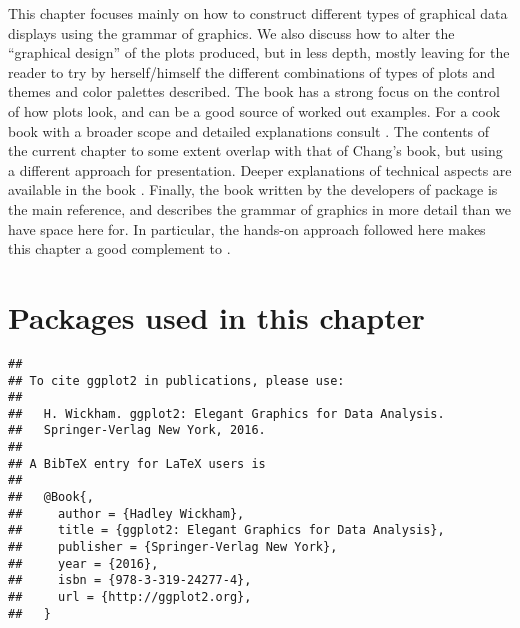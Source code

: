 \documentclass[krantz2]{krantz}\usepackage{knitr}%
\begin{document}
This chapter focuses mainly on how to construct different types of graphical data displays using the grammar of graphics. We also discuss how to alter the ``graphical design'' of the plots produced, but in less depth, mostly leaving for the reader to try by herself/himself the different combinations of types of plots and themes and color palettes described. The book  \autocite{Burchell2016} has a strong focus on the control of how plots look, and can be a good source of worked out examples. For a cook book with a broader scope and detailed explanations consult  \autocite{Chang2013}. The contents of the current chapter to some extent overlap with that of Chang's book, but using a different approach for presentation. Deeper explanations of technical aspects are available in the book  \autocite{Murrell2011}. Finally, the book  \autocite{Wickham2016} written by the developers of package  is the main reference, and describes the grammar of graphics in more detail than we have space here for. In particular, the hands-on approach followed here makes this chapter a good complement to .

\section{Packages used in this chapter}

\begin{knitrout}\footnotesize
{}\color{fgcolor}\begin{kframe}
\begin{alltt}
\hlstd{(} \hlstd{=} \hlstd{)}
\end{alltt}
\begin{verbatim}
## 
## To cite ggplot2 in publications, please use:
## 
##   H. Wickham. ggplot2: Elegant Graphics for Data Analysis.
##   Springer-Verlag New York, 2016.
## 
## A BibTeX entry for LaTeX users is
## 
##   @Book{,
##     author = {Hadley Wickham},
##     title = {ggplot2: Elegant Graphics for Data Analysis},
##     publisher = {Springer-Verlag New York},
##     year = {2016},
##     isbn = {978-3-319-24277-4},
##     url = {http://ggplot2.org},
##   }
\end{verbatim}
\end{kframe}
\end{knitrout}
\end{document}
